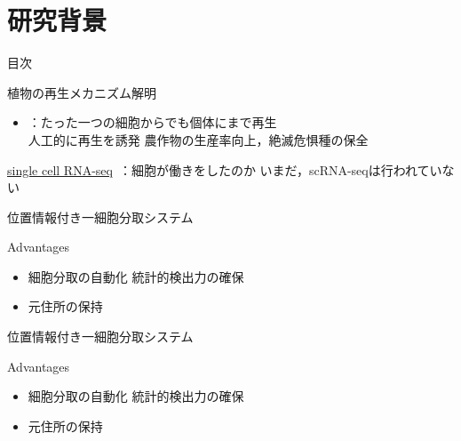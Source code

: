 \section{研究背景}

\begin{frame}[noframenumbering]{目次}
    \tableofcontents[currentsection]
\end{frame}

\begin{frame}{植物の再生メカニズム解明}
    \begin{itemize}
        \item {}：たった一つの細胞からでも個体にまで再生
        \\\ra 人工的に再生を誘発 \Ra 農作物の生産率向上，絶滅危惧種の保全
    \end{itemize}
    \vs
    \uline{single cell RNA-seq}\ \cite{kolodziejczyk2015technology}：細胞が働きをしたのか
    \Ra いまだ，scRNA-seqは行われていない
\end{frame}

\begin{frame}{位置情報付き一細胞分取システム}
    \begin{block}{Advantages}
        \begin{itemize}
            \item 細胞分取の自動化 \Ra 統計的検出力の確保
            \item 元住所の保持 \Ra {}
        \end{itemize}
    \end{block}
\end{frame}
\begin{frame}[noframenumbering]{位置情報付き一細胞分取システム}
    \begin{block}{Advantages}
        \begin{itemize}
            \item 細胞分取の自動化 \Ra 統計的検出力の確保
            \item 元住所の保持 \Ra {}
        \end{itemize}
    \end{block}
\end{frame}